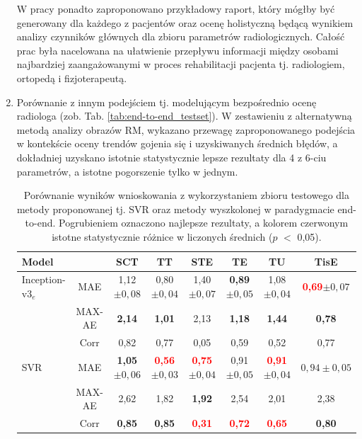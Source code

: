 \begin{enumerate}
 W pracy ponadto zaproponowano przykładowy raport, który mógłby być generowany dla każdego z pacjentów oraz ocenę holistyczną będącą wynikiem analizy czynników głównych dla zbioru parametrów radiologicznych. Całość prac była nacelowana na ułatwienie przepływu informacji między osobami najbardziej zaangażowanymi w proces rehabilitacji pacjenta tj. radiologiem, ortopedą i fizjoterapeutą.
 \item Porównanie z innym podejściem tj. modelującym bezpośrednio ocenę radiologa (zob. Tab. \ref{tab:end-to-end_testset}). W zestawieniu z alternatywną metodą analizy obrazów RM, wykazano przewagę zaproponowanego podejścia w kontekście oceny trendów gojenia się i uzyskiwanych średnich błędów, a dokładniej uzyskano istotnie statystycznie lepsze rezultaty dla 4 z 6-ciu parametrów, a istotne pogorszenie tylko w jednym.
 \vspace{0.5cm}
 \begin{table}[h!]
 	\caption{Porównanie wyników wnioskowania z wykorzystaniem zbioru testowego dla metody proponowanej tj. SVR oraz metody wyszkolonej w paradygmacie end-to-end. Pogrubieniem oznaczono najlepsze rezultaty, a kolorem czerwonym istotne statystycznie różnice w liczonych średnich ($p$ $<$ 0,05).}
 	\vspace{-0.5cm}
 	\tiny
 	\begin{center}
 		\hspace*{2em}\begin{tabular}{lc||c|c|c|c|c|c}
 			\textbf{Model} & & \textbf{SCT} & \textbf{TT} & \textbf{STE} & \textbf{TE} & \textbf{TU} & \textbf{TisE}\\ \hline \hline
 			Inception-v3$_{e}$ & MAE & 1,12$\pm{0,08}$ & 0,80$\pm{0,04}$ & 1,40$\pm{0,07}$ & \textbf{0,89}$\pm{0,05}$ & 1,08$\pm{0,04}$ & \textcolor{red}{\textbf{0,69}}$\pm{0,07}$ \\
 			& MAX-AE & \textbf{2,14} & \textbf{1,01} & 2,13 & \textbf{1,18} & \textbf{1,44} & \textbf{0,78} \\
 			& Corr & 0,82 & 0,77 & 0,05 & 0,59 & 0,52 & 0,77 \\ \hline
 			SVR & MAE & \textbf{1,05}$\pm0,06$ & \textcolor{red}{\textbf{0,56}}$\pm0,03$ & \textcolor{red}{\textbf{0,75}}$\pm0,04$ & 0,91$\pm0,05$ & \textcolor{red}{\textbf{0,91}}$\pm0,04$ & $0,94\pm0,05$\\
 			& MAX-AE & 2,62 & 1,82 & \textbf{1,92} & 2,54 & 2,01 & 2,38 \\
 			& Corr & \textbf{0,85} & \textbf{0,85} & \textcolor{red}{\textbf{0,31}} & \textcolor{red}{\textbf{0,72}} & \textcolor{red}{\textbf{0,65}} & \textbf{0,80} 

\end{tabular}
\end{center}
\end{table}
\end{enumerate}
